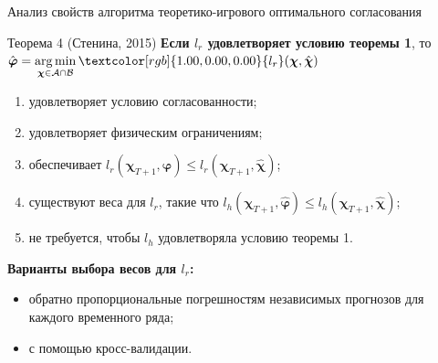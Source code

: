 \documentclass{beamer}
\newcommand\argmin{\mathop{\arg\min}}
\newcommand{\A}{\mathcal{A}}
\newcommand{\hchi}{\hat{\boldsymbol{\chi}}}
\newcommand{\hphi}{\hat{\boldsymbol{\varphi}}}
\newcommand{\B}{\mathcal{B}}
\begin{document}
\begin{frame}{Анализ свойств алгоритма теоретико-игрового оптимального согласования}

    \begin{block}{Теорема 4 (Стенина, 2015)}
    \textbf{Если $l_r$ удовлетворяет условию теоремы 1}, то ${\hphi = \argmin\limits_{\boldsymbol{\chi} \in \A \cap
            \B} \textcolor[rgb]{1.00,0.00,0.00}{l_r}(\boldsymbol{\chi}, \hchi)}$
    \begin{enumerate}
        \item удовлетворяет условию согласованности;
        \item удовлетворяет физическим ограничениям;
        \item обеспечивает $l_r(\boldsymbol{\chi}_{T+1}, \hphi) \leq l_r(\boldsymbol{\chi}_{T+1},
        \hchi)$;
        \item существуют веса для $l_r$, такие что $l_h(\boldsymbol{\chi}_{T+1}, \hphi) \leq l_h(\boldsymbol{\chi}_{T+1},
        \hchi)$;
        \item не требуется, чтобы $l_h$ удовлетворяла условию теоремы 1.
    \end{enumerate}
    \end{block}

    \textbf{Варианты выбора весов для $l_r$:}
    \begin{itemize}
        \item обратно пропорциональные погрешностям независимых
        прогнозов для каждого временного ряда;
        \item с помощью кросс-валидации.
    \end{itemize}
\end{frame}
\end{document}
